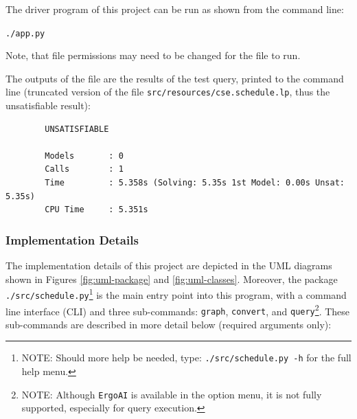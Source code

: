 \documentclass[12pt]{article}
\begin{document}
    The driver program of this project can be run as shown from the command line:

    {\tt{./app.py}}

    Note, that file permissions may need to be changed for the file to run.

    The outputs of the file are the results of the test query, printed to the command line (truncated version of the file {\tt{src/resources/cse.schedule.lp}}, thus the unsatisfiable result): \\

    \begin{verbatim}
        UNSATISFIABLE
        
        Models       : 0
        Calls        : 1
        Time         : 5.358s (Solving: 5.35s 1st Model: 0.00s Unsat: 5.35s)
        CPU Time     : 5.351s
    \end{verbatim}

    
    

    \subsubsection{Implementation Details}
    \label{subsubsec:implementation}

    
    The implementation details of this project are depicted in the UML diagrams shown in Figures \ref{fig:uml-package} and \ref{fig:uml-classes}. Moreover, the package {\tt{./src/schedule.py}}\footnote{NOTE: Should more help be needed, type: {\tt{./src/schedule.py -h}} for the full help menu.} is the main entry point into this program, with a command line interface (CLI) and three sub-commands: {\tt{graph}}, {\tt{convert}}, and {\tt{query}}\footnote{NOTE: Although {\tt{ErgoAI}} is available in the option menu, it is not fully supported, especially for query execution.}. These sub-commands are described in more detail below (required arguments only):
\end{document}
